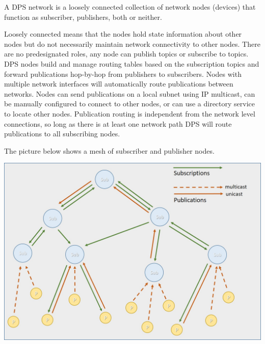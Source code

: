 A D\+PS network is a loosely connected collection of network nodes (devices) that function as subscriber, publishers, both or neither.

Loosely connected means that the nodes hold state information about other nodes but do not necessarily maintain network connectivity to other nodes. There are no predesignated roles, any node can publish topics or subscribe to topics. D\+PS nodes build and manage routing tables based on the subscription topics and forward publications hop-\/by-\/hop from publishers to subscribers. Nodes with multiple network interfaces will automatically route publications between networks. Nodes can send publications on a local subnet using IP multicast, can be manually configured to connect to other nodes, or can use a directory service to locate other nodes. Publication routing is independent from the network level connections, so long as there is at least one network path D\+PS will route publications to all subscribing nodes.

The picture below shows a mesh of subscriber and publisher nodes.

 
\begin{DoxyImage}
\includegraphics[width=\textwidth,height=\textheight/2,keepaspectratio=true]{dps_mesh.jpg}
\end{DoxyImage}


